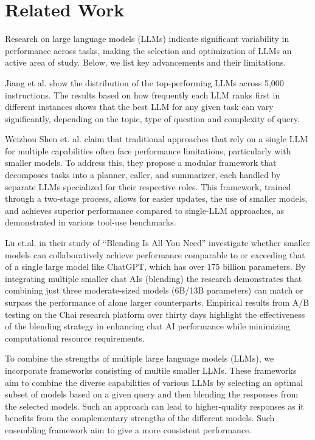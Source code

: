 \documentclass[sigconf,authordraft]{acmart}
\begin{document}
\section{Related Work}

Research on large language models (LLMs) indicate significant variability in performance across tasks, making the selection and optimization of LLMs an active area of study. Below, we list key advancements and their limitations.

Jiang et al. \cite{jiang-etal-2023-llm} show the distribution of the top-performing LLMs across 5,000 instructions. The results based on how frequently each LLM ranks first in different instances shows that the best LLM for any given task can vary significantly, depending on the topic, type of question and complexity of query.

Weizhou Shen et. al. \cite{shen2024smallllmsweaktool} claim that traditional approaches that rely on a single LLM for multiple capabilities often face performance limitations, particularly with smaller models. To address this, they propose a modular framework that decomposes tasks into a planner, caller, and summarizer, each handled by separate LLMs specialized for their respective roles. This framework, trained through a two-stage process, allows for easier updates, the use of smaller models, and achieves superior performance compared to single-LLM approaches, as demonstrated in various tool-use benchmarks.

Lu et.al. in their study of ``Blending Is All You Need''\cite{lu2024blendingneedcheaperbetter} investigate whether smaller models can collaboratively achieve performance comparable to or exceeding that of a single large model like ChatGPT, which has over 175 billion parameters. By integrating multiple smaller chat AIs (blending) the research demonstrates that combining just three moderate-sized models (6B/13B parameters) can match or surpass the performance of alone larger counterparts. Empirical results from A/B testing on the Chai research platform over thirty days highlight the effectiveness of the blending strategy in enhancing chat AI performance while minimizing computational resource requirements.

To combine the strengths of multiple large language models (LLMs), we incorporate frameworks consisting of multile smaller LLMs. These frameworks aim to combine the diverse capabilities of various LLMs by selecting an optimal subset of models based on a given query and then blending the responses from the selected models. Such an approach can lead to higher-quality responses as it benefits from the complementary strengths of the different models. Such ensembling framework aim to give a more consistent performance.
\end{document}
